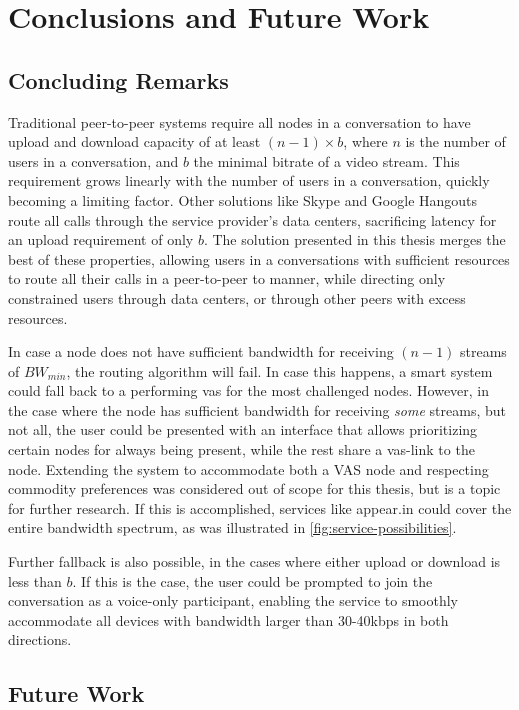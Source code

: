 \chapter{Conclusions and Future Work}\label{chp:conclusions}


\section{Concluding Remarks}\label{sec:conclusions}

Traditional peer-to-peer systems require all nodes in a conversation to have upload and download capacity of at least $(n-1) \times b$, where $n$ is the number of users in a conversation, and $b$ the minimal bitrate of a video stream. This requirement grows linearly with the number of users in a conversation, quickly becoming a limiting factor. Other solutions like Skype and Google Hangouts route all calls through the service provider's data centers, sacrificing latency for an upload requirement of only $b$. The solution presented in this thesis merges the best of these properties, allowing users in a conversations with sufficient resources to route all their calls in a peer-to-peer to manner, while directing only constrained users through data centers, or through other peers with excess resources.

In case a node does not have sufficient bandwidth for receiving $(n-1)$ streams of $BW_{min}$, the routing algorithm will fail. In case this happens, a smart system could fall back to a performing \gls{vas} for the most challenged nodes. However, in the case where the node has sufficient bandwidth for receiving \emph{some} streams, but not all, the user could be presented with an interface that allows prioritizing certain nodes for always being present, while the rest share a \gls{vas}-link to the node. Extending the system to accommodate both a VAS node and respecting commodity preferences was considered out of scope for this thesis, but is a topic for further research. If this is accomplished, services like appear.in could cover the entire bandwidth spectrum, as was illustrated in \autoref{fig:service-possibilities}.

Further fallback is also possible, in the cases where either upload or download is less than $b$. If this is the case, the user could be prompted to join the conversation as a voice-only participant, enabling the service to smoothly accommodate all devices with bandwidth larger than 30-40kbps in both directions.


\section{Future Work}\label{sec:future_work}

